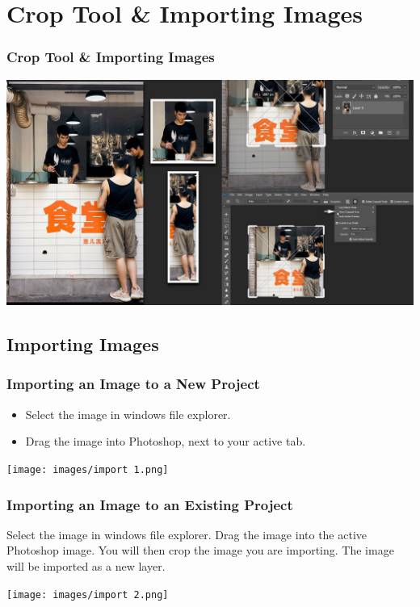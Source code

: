 \documentclass{beamer}
\begin{document}
	\section{Crop Tool \& Importing Images}
		\begin{frame}
		\frametitle{Crop Tool \& Importing Images}
		\begin{center}
			\includegraphics[width = 1.0\textwidth]{images/crop-tool-photoshop-2020.jpg}
		\end{center}
	\end{frame}
	
		\subsection{Importing Images}
\begin{frame}
	\frametitle{Importing an Image to a New Project}
	\begin{itemize}
		\item Select the image in windows file explorer.
		\item Drag the image into Photoshop, next to your active tab.
	\end{itemize}
	\begin{center}
		\texttt{[image: images/import 1.png]}
	\end{center}
\end{frame}

\begin{frame}
	\frametitle{Importing an Image to an Existing Project}
	\begin{outline}
		\1 Select the image in windows file explorer.
		\1 Drag the image into the active Photoshop image.
		\1 You will then crop the image you are importing.
		\1 The image will be imported as a new layer.
	\end{outline}
	\begin{center}
		\texttt{[image: images/import 2.png]}
	\end{center}
\end{frame}
\end{document}
